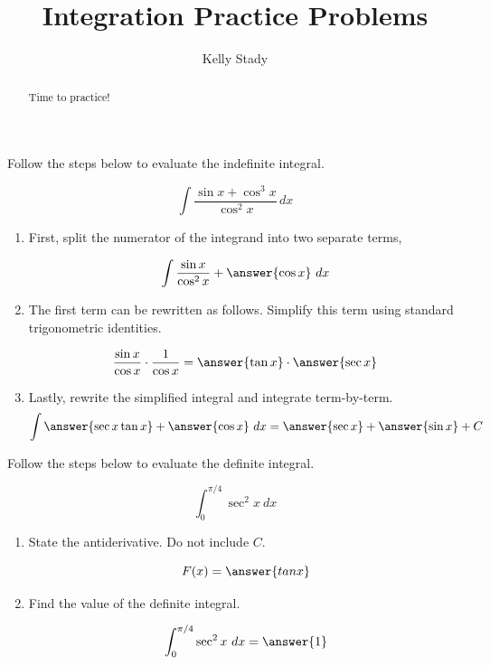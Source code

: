 \documentclass{ximera}
\title{Integration Practice Problems}   %
\author{Kelly Stady}
\begin{document}
\begin{abstract}
    Time to practice!
\end{abstract}
\maketitle
\label{xim:IntegExercises}


\begin{problem}
Follow the steps below to evaluate the indefinite integral.

\[
\int \frac{\sin x + \cos^3 x }{\cos^2 x} \, dx
\]

\begin{enumerate}
\item First, split the numerator of the integrand into two separate terms,

\[
\int \frac{\sin x}{\cos^2 x} + \answer{\cos x}  \ dx
\]

\item The first term can be rewritten as follows.  Simplify this term using standard trigonometric identities.

\[ \frac{\sin x}{\cos x} \cdot \frac{1}{\cos x} = \answer{\tan x} \cdot \answer{\sec x} \]

\item Lastly, rewrite the simplified integral and integrate term-by-term.
\[
\int \answer{\sec x \tan x} + \answer{\cos x} \ dx = \answer{\sec x} + \answer{\sin x} + C
\]

\end{enumerate}
\end{problem}


\begin{problem}
Follow the steps below to evaluate the definite integral.

 \[ \int_{0}^{\pi/4} \sec^2 x \ dx \]

\begin{enumerate}
\item State the antiderivative.  Do not include $C.$  

    \[ F(x) = \answer{tan x} \]


\item Find the value of the definite integral.

    \[ \int_{0}^{\pi/4} \sec^2 x \ dx = \answer{1}   \]

\end{enumerate}
\end{problem}
\end{document}

